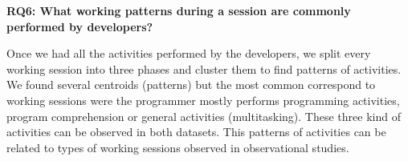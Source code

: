 \textbf{RQ6: What working patterns during a session are commonly performed by developers?}

Once we had all the activities performed by the developers, we split every working session into three phases and cluster them to find patterns of activities. We found several centroids (patterns) but the most common correspond to working sessions were the programmer mostly performs programming activities, program comprehension or general activities (multitasking). These three kind of activities can be observed in both datasets. This patterns of activities can be related to types of working sessions observed in observational studies.



